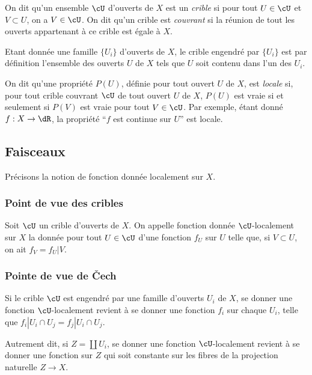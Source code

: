 On dit qu'un ensemble $\cU$ d'ouverts de $X$ est un \emph{crible} si pour tout 
$U\in\cU$ et $V\subset U$, on a $V\in\cU$. On dit qu'un crible est 
\emph{couvrant} si la réunion de tout les ouverts appartenant à ce crible est 
égale à $X$.

Etant donnée une famille $\{U_i\}$ d'ouverts de $X$, le crible engendré par 
$\{U_i\}$ est par définition l'ensemble des ouverts $U$ de $X$ tels que $U$ 
soit contenu dans l'un des $U_i$. 

On dit qu'une propriété $P(U)$, définie pour tout ouvert $U$ de $X$, est 
\emph{locale} si, pour tout crible couvrant $\cU$ de tout ouvert $U$ de $X$, 
$P(U)$ est vraie si et seulement si $P(V)$ est vraie pour tout $V\in \cU$. Par 
exemple, étant donné $f:X\to \dR$, la propriété ``$f$ est continue sur $U$'' 
est locale. 





\subsection{Faisceaux}\label{I:1-2}

Précisons la notion de fonction donnée localement sur $X$.





\subsubsection{Point de vue des cribles}\label{I:1-2-1}

Soit $\cU$ un crible d'ouverts de $X$. On appelle fonction donnée 
$\cU$-localement sur $X$ la donnée pour tout $U\in \cU$ d'une fonction $f_U$ 
sur $U$ telle que, si $V\subset U$, on ait $f_V=f_U|V$. 





\subsubsection{Pointe de vue de Čech}\label{I:1-2-2}

Si le crible $\cU$ est engendré par une famille d'ouverts $U_i$ de $X$, se 
donner une fonction $\cU$-localement revient à se donner une fonction $f_i$ 
sur chaque $U_i$, telle que $f_i|{U_i\cap U_j} = f_j|{U_i\cap U_j}$. 

Autrement dit, si $Z=\coprod U_i$, se donner une fonction $\cU$-localement 
revient à se donner une fonction sur $Z$ qui soit constante sur les fibres de 
la projection naturelle $Z\to X$. 





